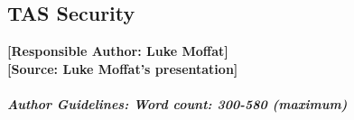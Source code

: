 \documentclass[sigconf]{acmart}
\begin{document}
\subsection{TAS Security}
\noindent\textbf{[Responsible Author:  Luke Moffat]}\\
\noindent\textbf{[Source: Luke Moffat's presentation]}\\\\
\noindent\textbf{\textit{Author Guidelines: Word count: 300-580 (maximum)}}\\
%
%
%
%
%
%
\end{document}
